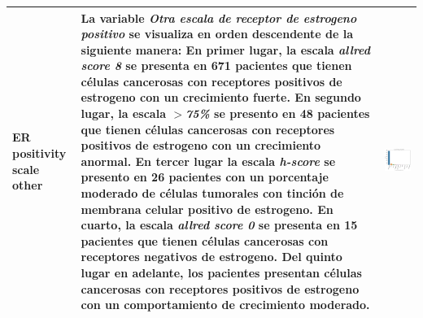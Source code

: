\begin{table}[!htb]
\begin{threeparttable}
\begin{tabular}{p{2.5cm} p{7cm} p{6.5cm}}
			ER positivity scale other
			&La variable \textit{Otra escala de receptor de estrogeno positivo} se visualiza en orden descendente de la siguiente manera: En primer lugar, la escala \textit{allred score 8} se presenta en 671 pacientes que tienen células cancerosas con receptores positivos de estrogeno con un crecimiento fuerte. En segundo lugar, la escala $>$\textit{75\%} se presento en 48 pacientes que tienen células cancerosas con receptores positivos de estrogeno con un crecimiento anormal. En tercer lugar la escala \textit{h-score} se presento en 26 pacientes con un porcentaje moderado de células tumorales con tinción de membrana celular positivo de estrogeno. En cuarto, la escala \textit{allred score 0} se presenta en 15 pacientes que tienen células cancerosas con receptores negativos de estrogeno. Del quinto lugar en adelante, los pacientes presentan células cancerosas con receptores positivos de estrogeno con un comportamiento de crecimiento moderado.
			& \begin{center}\includegraphics[width=1\linewidth]{NOTEBOOK/IMAGENES_DESCRIPTIVAS/11_er_positivity_scale_other}\end{center}
			\\ \hline
		\end{tabular}
	\end{threeparttable}
\end{table}

